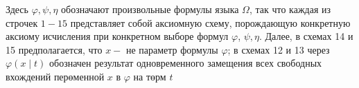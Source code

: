 \documentclass[10pt]{article}
\begin{document}
Здесь $\varphi, \psi, \eta$ обозначают произвольные формулы языка $\Omega$, так что каждая из строчек $1-15$ представляет собой аксиомную схему, порождающую конкретную аксиому исчисления при конкретном выборе формул $\varphi$, $\psi, \eta$. Далее, в схемах 14 и 15 предполагается, что $x-$ не параметр формулы $\varphi$; в схемах 12 и 13 через $\varphi(x \mid t)$ обозначен результат одновременного замещения всех свободных вхождений перөменной $x$ в $\varphi$ на төрм $t$
\end{document}
